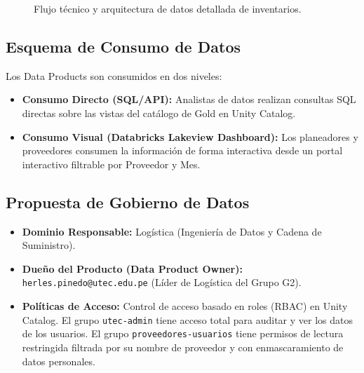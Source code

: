 \documentclass[11pt,a4paper]{article}
\begin{document}
\begin{figure}[h]
    \caption{Flujo técnico y arquitectura de datos detallada de inventarios.}
\end{figure}

\subsection{Esquema de Consumo de Datos}
Los Data Products son consumidos en dos niveles:
\begin{itemize}
    \item \textbf{Consumo Directo (SQL/API):} Analistas de datos realizan consultas SQL directas sobre las vistas del catálogo de Gold en Unity Catalog.
    \item \textbf{Consumo Visual (Databricks Lakeview Dashboard):} Los planeadores y proveedores consumen la información de forma interactiva desde un portal interactivo filtrable por Proveedor y Mes.
\end{itemize}

\subsection{Propuesta de Gobierno de Datos}
\begin{itemize}
    \item \textbf{Dominio Responsable:} Logística (Ingeniería de Datos y Cadena de Suministro).
    \item \textbf{Dueño del Producto (Data Product Owner):} \texttt{herles.pinedo@utec.edu.pe} (Líder de Logística del Grupo G2).
    \item \textbf{Políticas de Acceso:} Control de acceso basado en roles (RBAC) en Unity Catalog. El grupo \texttt{utec-admin} tiene acceso total para auditar y ver los datos de los usuarios. El grupo \texttt{proveedores-usuarios} tiene permisos de lectura restringida filtrada por su nombre de proveedor y con enmascaramiento de datos personales.
\end{itemize}
\end{document}
